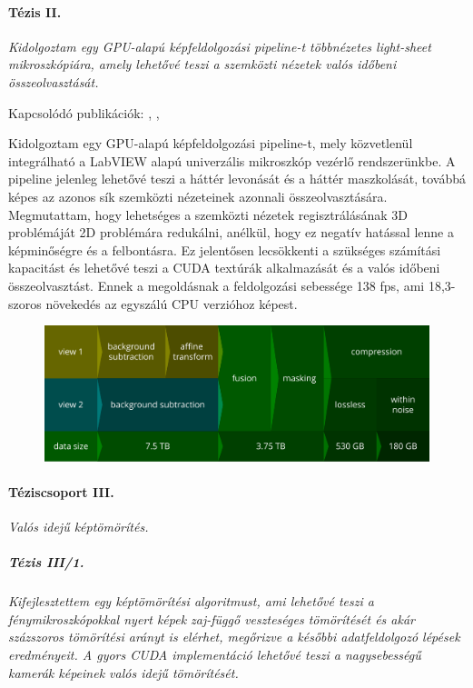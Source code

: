 \documentclass{booklet_style}
\begin{document}
  \paragraph{Tézis II.} \textit{Kidolgoztam egy GPU-alapú képfeldolgozási pipeline-t többnézetes light-sheet mikroszkópiára, amely lehetővé teszi a szemközti nézetek valós időbeni összeolvasztását.}

    Kapcsolódó publikációk: \cite{balazs_gpu-based_2016}, \cite{balazs_gpu-based_2016-1}, \cite{balazs_gpu-based_2017}

    Kidolgoztam egy GPU-alapú képfeldolgozási pipeline-t, mely közvetlenül integrálható a LabVIEW alapú univerzális mikroszkóp vezérlő rendszerünkbe. A pipeline jelenleg lehetővé teszi a háttér levonását és a háttér maszkolását, továbbá képes az azonos sík szemközti nézeteinek azonnali összeolvasztására. Megmutattam, hogy lehetséges a szemközti nézetek regisztrálásának 3D problémáját 2D problémára redukálni, anélkül, hogy ez negatív hatással lenne a képminőségre és a felbontásra. Ez jelentősen lecsökkenti a szükséges számítási kapacitást és lehetővé teszi a CUDA textúrák alkalmazását és a valós időbeni összeolvasztást. Ennek a megoldásnak a feldolgozási sebessége 138 fps, ami 18,3-szoros növekedés az egyszálú CPU verzióhoz képest.


    \begin{figure}
      \centering
      \includegraphics[width=\textwidth]{4_gpu/pipeline}
      \label{fig:pipeline}
    \end{figure}
    
  \paragraph{Téziscsoport III.} \textit{Valós idejű képtömörítés.}
  \subparagraph{Tézis III/1.} \textit{Kifejlesztettem egy képtömörítési algoritmust, ami lehetővé teszi a fénymikroszkópokkal nyert képek zaj-függő veszteséges tömörítését és akár százszoros tömörítési arányt is elérhet, megőrizve a későbbi adatfeldolgozó lépések eredményeit. A gyors CUDA implementáció lehetővé teszi a nagysebességű kamerák képeinek valós idejű tömörítését.}
\end{document}
